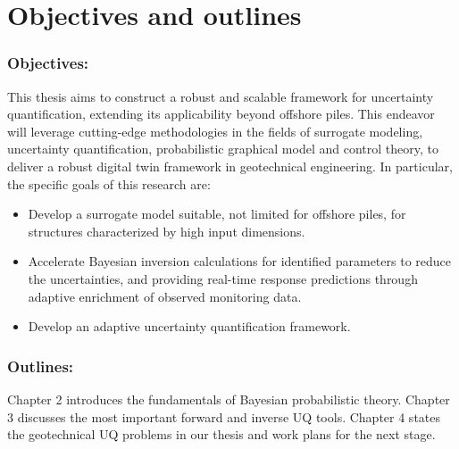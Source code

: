 \section{Objectives and outlines}
\subsubsection{Objectives:}
This thesis aims to construct a robust and scalable framework for uncertainty quantification, extending its applicability beyond offshore piles. This endeavor will leverage cutting-edge methodologies in the fields of surrogate modeling, uncertainty quantification, probabilistic graphical model and control theory, to deliver a robust digital twin framework in geotechnical engineering. In particular, the specific goals of this research are:
\begin{itemize}[left=0pt]
    \item Develop a surrogate model suitable, not limited for offshore piles, for structures characterized by high input dimensions.
    
    \item Accelerate Bayesian inversion calculations for identified parameters to reduce the uncertainties, and providing real-time response predictions through adaptive enrichment of observed monitoring data.
    
    \item Develop an adaptive uncertainty quantification framework.

  
\end{itemize}


\subsubsection{Outlines:}
Chapter 2 introduces the fundamentals of Bayesian probabilistic theory.
Chapter 3 discusses the most important forward and inverse UQ tools.
Chapter 4 states the geotechnical UQ problems in our thesis and work plans for the next stage.
